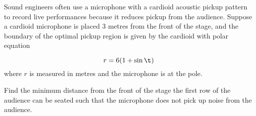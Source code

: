 \documentclass{echw}
\begin{document}

    \problem{}
        \begin{center}
        \end{center}

        Sound engineers often use a microphone with a cardioid acoustic pickup pattern to record live performances because it reduces pickup from the audience. Suppose a cardioid microphone is placed 3 metres from the front of the stage, and the boundary of the optimal pickup region is given by the cardioid with polar equation

        \begin{equation*}
            r = 6(1 + \sin \t)
        \end{equation*}
        where $r$ is measured in metres and the microphone is at the pole.

        Find the minimum distance from the front of the stage the first row of the audience can be seated such that the microphone does not pick up noise from the audience.
\end{document}
